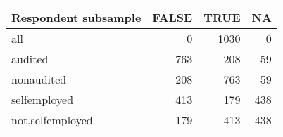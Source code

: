 \begin{table}[ht]
\centering
\begin{tabular}{lrrr}
  \hline
Respondent subsample & FALSE & TRUE & NA \\ 
  \hline
all & 0 & 1030 & 0 \\ 
  audited & 763 & 208 & 59 \\ 
  nonaudited & 208 & 763 & 59 \\ 
  selfemployed & 413 & 179 & 438 \\ 
  not.selfemployed & 179 & 413 & 438 \\ 
   \hline
\end{tabular}
\end{table}
